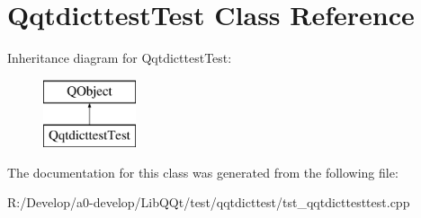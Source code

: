 \hypertarget{class_qqtdicttest_test}{}\section{Qqtdicttest\+Test Class Reference}
\label{class_qqtdicttest_test}
Inheritance diagram for Qqtdicttest\+Test\+:\begin{figure}[H]
\begin{center}
\leavevmode
\includegraphics[height=2.000000cm]{class_qqtdicttest_test}
\end{center}
\end{figure}


The documentation for this class was generated from the following file\+:\begin{DoxyCompactItemize}
\item 
R\+:/\+Develop/a0-\/develop/\+Lib\+Q\+Qt/test/qqtdicttest/tst\+\_\+qqtdicttesttest.\+cpp\end{DoxyCompactItemize}
